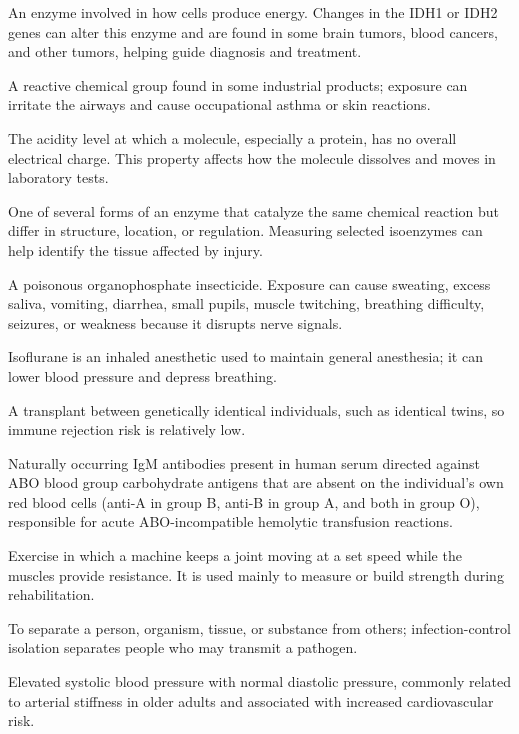  An enzyme involved in how cells produce energy. Changes in the IDH1 or IDH2 genes can alter this enzyme and are found in some brain tumors, blood cancers, and other tumors, helping guide diagnosis and treatment.

 A reactive chemical group found in some industrial products; exposure can irritate the airways and cause occupational asthma or skin reactions.

 The acidity level at which a molecule, especially a protein, has no overall electrical charge. This property affects how the molecule dissolves and moves in laboratory tests.

 One of several forms of an enzyme that catalyze the same chemical reaction but differ in structure, location, or regulation. Measuring selected isoenzymes can help identify the tissue affected by injury.

 A poisonous organophosphate insecticide. Exposure can cause sweating, excess saliva, vomiting, diarrhea, small pupils, muscle twitching, breathing difficulty, seizures, or weakness because it disrupts nerve signals.

 Isoflurane is an inhaled anesthetic used to maintain general anesthesia; it can lower blood pressure and depress breathing.

 A transplant between genetically identical individuals, such as identical twins, so immune rejection risk is relatively low.

 Naturally occurring IgM antibodies present in human serum directed against ABO blood group carbohydrate antigens that are absent on the individual's own red blood cells (anti-A in group B, anti-B in group A, and both in group O), responsible for acute ABO-incompatible hemolytic transfusion reactions.

 Exercise in which a machine keeps a joint moving at a set speed while the muscles provide resistance. It is used mainly to measure or build strength during rehabilitation.

 To separate a person, organism, tissue, or substance from others; infection-control isolation separates people who may transmit a pathogen.

 Elevated systolic blood pressure with normal diastolic pressure, commonly related to arterial stiffness in older adults and associated with increased cardiovascular risk.


